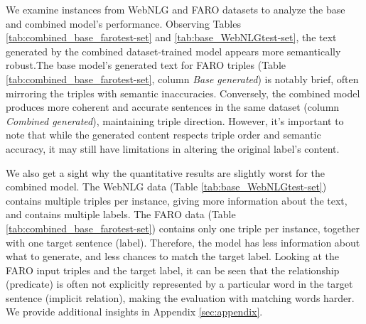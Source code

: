 \documentclass[
hf, %
]{ceurart}
\begin{document}
We examine instances from WebNLG and FARO datasets to analyze the base and combined model's performance. Observing Tables \ref{tab:combined_base_farotest-set} and \ref{tab:base_WebNLGtest-set}, the text generated by the combined dataset-trained model appears more semantically robust.The base model's generated text for FARO triples (Table \ref{tab:combined_base_farotest-set}, column \textit{Base generated}) is notably brief, often mirroring the triples with semantic inaccuracies. Conversely, the combined model produces more coherent and accurate sentences in the same dataset (column \textit{Combined generated}), maintaining triple direction. However, it's important to note that while the generated content respects triple order and semantic accuracy, it may still have limitations in altering the original label's content.

We also get a sight why the quantitative results are slightly worst for the combined model. The WebNLG data (Table \ref{tab:base_WebNLGtest-set}) contains multiple triples per instance, giving more information about the text, and contains multiple labels. The FARO data (Table \ref{tab:combined_base_farotest-set}) contains only one triple per instance, together with one target sentence (label). Therefore, the model has less information about what to generate, and less chances to match the target label. Looking at the FARO input triples and the target label, it can be seen that the relationship (predicate) is often not explicitly represented by a particular word in the target sentence (implicit relation), making the evaluation with matching words harder. We provide additional insights in Appendix \ref{sec:appendix}.
\end{document}
